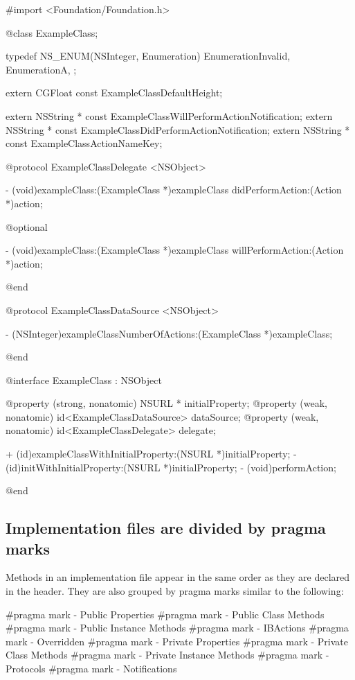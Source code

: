 \documentclass[10pt]{extarticle}
\newenvironment{codelisting}
{\footnotesize\mdframed[middlelinewidth=0.5pt, middlelinecolor=BaliHaiColor, skipabove=15pt]\verbatim}
{\endverbatim\endmdframed\vspace{12pt}\normalsize}
\begin{document}
\begin{codelisting}
#import <Foundation/Foundation.h>

@class ExampleClass;


typedef NS_ENUM(NSInteger, Enumeration) {
    EnumerationInvalid,
    EnumerationA,
};

extern CGFloat const ExampleClassDefaultHeight;

extern NSString * const ExampleClassWillPerformActionNotification;
extern NSString * const ExampleClassDidPerformActionNotification;
extern NSString * const ExampleClassActionNameKey;


@protocol ExampleClassDelegate <NSObject>

- (void)exampleClass:(ExampleClass *)exampleClass didPerformAction:(Action *)action;

@optional

- (void)exampleClass:(ExampleClass *)exampleClass willPerformAction:(Action *)action;

@end


@protocol ExampleClassDataSource <NSObject>

- (NSInteger)exampleClassNumberOfActions:(ExampleClass *)exampleClass;

@end


@interface ExampleClass : NSObject

@property (strong, nonatomic) NSURL * initialProperty;
@property (weak, nonatomic) id<ExampleClassDataSource> dataSource;
@property (weak, nonatomic) id<ExampleClassDelegate> delegate;

+ (id)exampleClassWithInitialProperty:(NSURL *)initialProperty;
- (id)initWithInitialProperty:(NSURL *)initialProperty;
- (void)performAction;

@end
\end{codelisting}


\subsection{Implementation files are divided by pragma marks}

Methods in an implementation file appear in the same order as they are declared in the header. They are also grouped by pragma marks similar to the following:

\begin{codelisting}
#pragma mark - Public Properties
#pragma mark - Public Class Methods
#pragma mark - Public Instance Methods
#pragma mark - IBActions
#pragma mark - Overridden
#pragma mark - Private Properties
#pragma mark - Private Class Methods
#pragma mark - Private Instance Methods
#pragma mark - Protocols
#pragma mark - Notifications
\end{codelisting}
\end{document}
